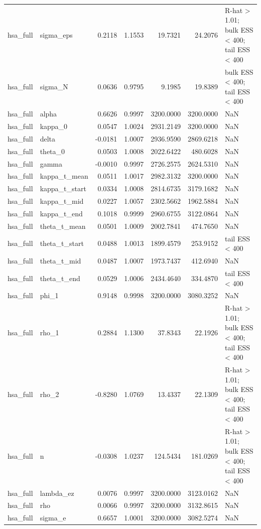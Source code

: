 \begin{tabular}{llrrrrl}
hsa\_full & sigma\_eps & 0.2118 & 1.1553 & 19.7321 & 24.2076 & R-hat > 1.01; bulk ESS < 400; tail ESS < 400 \\
hsa\_full & sigma\_N & 0.0636 & 0.9795 & 9.1985 & 19.8389 & bulk ESS < 400; tail ESS < 400 \\
hsa\_full & alpha & 0.6626 & 0.9997 & 3200.0000 & 3200.0000 & NaN \\
hsa\_full & kappa\_0 & 0.0547 & 1.0024 & 2931.2149 & 3200.0000 & NaN \\
hsa\_full & delta & -0.0181 & 1.0007 & 2936.9590 & 2869.6218 & NaN \\
hsa\_full & theta\_0 & 0.0503 & 1.0008 & 2022.6422 & 480.6028 & NaN \\
hsa\_full & gamma & -0.0010 & 0.9997 & 2726.2575 & 2624.5310 & NaN \\
hsa\_full & kappa\_t\_mean & 0.0511 & 1.0017 & 2982.3132 & 3200.0000 & NaN \\
hsa\_full & kappa\_t\_start & 0.0334 & 1.0008 & 2814.6735 & 3179.1682 & NaN \\
hsa\_full & kappa\_t\_mid & 0.0227 & 1.0057 & 2302.5662 & 1962.5884 & NaN \\
hsa\_full & kappa\_t\_end & 0.1018 & 0.9999 & 2960.6755 & 3122.0864 & NaN \\
hsa\_full & theta\_t\_mean & 0.0501 & 1.0009 & 2002.7841 & 474.7650 & NaN \\
hsa\_full & theta\_t\_start & 0.0488 & 1.0013 & 1899.4579 & 253.9152 & tail ESS < 400 \\
hsa\_full & theta\_t\_mid & 0.0487 & 1.0007 & 1973.7437 & 412.6940 & NaN \\
hsa\_full & theta\_t\_end & 0.0529 & 1.0006 & 2434.4640 & 334.4870 & tail ESS < 400 \\
hsa\_full & phi\_1 & 0.9148 & 0.9998 & 3200.0000 & 3080.3252 & NaN \\
hsa\_full & rho\_1 & 0.2884 & 1.1300 & 37.8343 & 22.1926 & R-hat > 1.01; bulk ESS < 400; tail ESS < 400 \\
hsa\_full & rho\_2 & -0.8280 & 1.0769 & 13.4337 & 22.1309 & R-hat > 1.01; bulk ESS < 400; tail ESS < 400 \\
hsa\_full & n & -0.0308 & 1.0237 & 124.5434 & 181.0269 & R-hat > 1.01; bulk ESS < 400; tail ESS < 400 \\
hsa\_full & lambda\_ez & 0.0076 & 0.9997 & 3200.0000 & 3123.0162 & NaN \\
hsa\_full & rho & 0.0066 & 0.9997 & 3200.0000 & 3132.8615 & NaN \\
hsa\_full & sigma\_e & 0.6657 & 1.0001 & 3200.0000 & 3082.5274 & NaN \\

\end{tabular}
